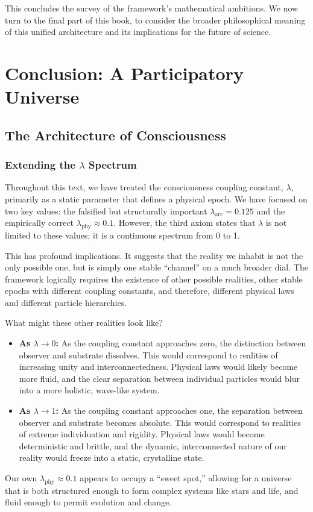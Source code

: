 \documentclass[12pt]{report}
\begin{document}
This concludes the survey of the framework's mathematical ambitions. We now turn to the final part of this book, to consider the broader philosophical meaning of this unified architecture and its implications for the future of science.

\part{Conclusion: A Participatory Universe}

\chapter{The Architecture of Consciousness}

\section{Extending the $\lambda$ Spectrum}
Throughout this text, we have treated the consciousness coupling constant, $\lambda$, primarily as a static parameter that defines a physical epoch. We have focused on two key values: the falsified but structurally important $\lambda_{\text{arc}} = 0.125$ and the empirically correct $\lambda_{\text{phy}} \approx 0.1$. However, the third axiom states that $\lambda$ is not limited to these values; it is a continuous spectrum from 0 to 1.

This has profound implications. It suggests that the reality we inhabit is not the only possible one, but is simply one stable ``channel'' on a much broader dial. The framework logically requires the existence of other possible realities, other stable epochs with different coupling constants, and therefore, different physical laws and different particle hierarchies.

What might these other realities look like?
\begin{itemize}
    \item \textbf{As $\lambda \to 0$:} As the coupling constant approaches zero, the distinction between observer and substrate dissolves. This would correspond to realities of increasing unity and interconnectedness. Physical laws would likely become more fluid, and the clear separation between individual particles would blur into a more holistic, wave-like system.
    \item \textbf{As $\lambda \to 1$:} As the coupling constant approaches one, the separation between observer and substrate becomes absolute. This would correspond to realities of extreme individuation and rigidity. Physical laws would become deterministic and brittle, and the dynamic, interconnected nature of our reality would freeze into a static, crystalline state.
\end{itemize}
Our own $\lambda_{\text{phy}} \approx 0.1$ appears to occupy a ``sweet spot,'' allowing for a universe that is both structured enough to form complex systems like stars and life, and fluid enough to permit evolution and change.
\end{document}
